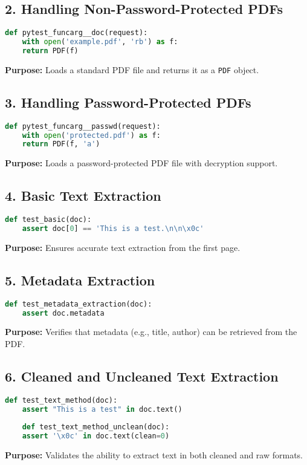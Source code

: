 \subsection{2. Handling Non-Password-Protected PDFs}
\begin{lstlisting}[language=Python]
	def pytest_funcarg__doc(request):
	with open('example.pdf', 'rb') as f:
	return PDF(f)
\end{lstlisting}
\textbf{Purpose:} Loads a standard PDF file and returns it as a \texttt{PDF} object.

\subsection{3. Handling Password-Protected PDFs}
\begin{lstlisting}[language=Python]
	def pytest_funcarg__passwd(request):
	with open('protected.pdf') as f:
	return PDF(f, 'a')
\end{lstlisting}
\textbf{Purpose:} Loads a password-protected PDF file with decryption support.

\subsection{4. Basic Text Extraction}
\begin{lstlisting}[language=Python]
	def test_basic(doc):
	assert doc[0] == 'This is a test.\n\n\x0c'
\end{lstlisting}
\textbf{Purpose:} Ensures accurate text extraction from the first page.

\subsection{5. Metadata Extraction}
\begin{lstlisting}[language=Python]
	def test_metadata_extraction(doc):
	assert doc.metadata
\end{lstlisting}
\textbf{Purpose:} Verifies that metadata (e.g., title, author) can be retrieved from the PDF.

\subsection{6. Cleaned and Uncleaned Text Extraction}
\begin{lstlisting}[language=Python]
	def test_text_method(doc):
	assert "This is a test" in doc.text()
	
	def test_text_method_unclean(doc):
	assert '\x0c' in doc.text(clean=0)
\end{lstlisting}
\textbf{Purpose:} Validates the ability to extract text in both cleaned and raw formats.

